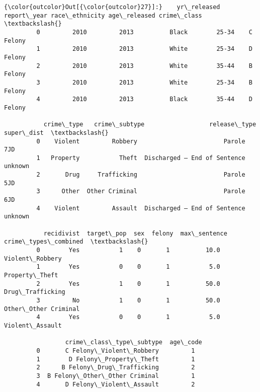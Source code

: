\documentclass[11pt]{article}
\begin{document}
\begin{Verbatim}[commandchars=\\\{\}]
{\color{outcolor}Out[{\color{outcolor}27}]:}    yr\_released  report\_year race\_ethnicity age\_released crime\_class  \textbackslash{}
         0         2010         2013          Black        25-34    C Felony   
         1         2010         2013          White        25-34    D Felony   
         2         2010         2013          White        35-44    B Felony   
         3         2010         2013          White        25-34    B Felony   
         4         2010         2013          Black        35-44    D Felony   
         
           crime\_type   crime\_subtype                  release\_type super\_dist  \textbackslash{}
         0    Violent         Robbery                        Parole        7JD   
         1   Property           Theft  Discharged – End of Sentence    unknown   
         2       Drug     Trafficking                        Parole        5JD   
         3      Other  Other Criminal                        Parole        6JD   
         4    Violent         Assault  Discharged – End of Sentence    unknown   
         
           recidivist  target\_pop  sex  felony  max\_sentence  crime\_types\_combined  \textbackslash{}
         0        Yes           1    0       1          10.0       Violent\_Robbery   
         1        Yes           0    0       1           5.0        Property\_Theft   
         2        Yes           1    0       1          50.0      Drug\_Trafficking   
         3         No           1    0       1          50.0  Other\_Other Criminal   
         4        Yes           0    0       1           5.0       Violent\_Assault   
         
                 crime\_class\_type\_subtype  age\_code  
         0       C Felony\_Violent\_Robbery         1  
         1        D Felony\_Property\_Theft         1  
         2      B Felony\_Drug\_Trafficking         2  
         3  B Felony\_Other\_Other Criminal         1  
         4       D Felony\_Violent\_Assault         2  
\end{Verbatim}
            
\end{document}
